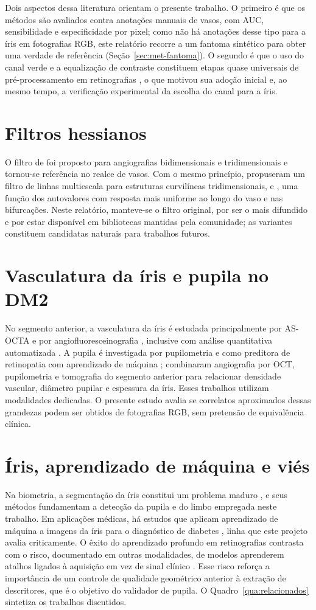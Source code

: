 \documentclass[12pt, oneside, a4paper, chapter=TITLE, section=TITLE,
               english, brazil]{abntex2}
\newcommand{\secao}[1]{\section[\texorpdfstring{\protect\MakeTextUppercase{#1}}{#1}]{#1}}
\begin{document}
Dois aspectos dessa literatura orientam o presente trabalho. O primeiro é que
os métodos são avaliados contra anotações manuais de vasos, com AUC,
sensibilidade e especificidade por pixel; como não há anotações desse tipo
para a íris em fotografias RGB, este relatório recorre a um fantoma sintético
para obter uma verdade de referência (Seção~\ref{sec:met-fantoma}). O segundo
é que o uso do canal verde e a equalização de contraste constituem etapas
quase universais de pré-processamento em retinografias \citep*{Fraz2012}, o
que motivou sua adoção inicial e, ao mesmo tempo, a verificação experimental
da escolha do canal para a íris.

\secao{Filtros hessianos}

O filtro de \citet{Frangi1998} foi proposto para angiografias bidimensionais e
tridimensionais e tornou-se referência no realce de vasos. Com o mesmo
princípio, \citet{Sato1998} propuseram um filtro de linhas multiescala para
estruturas curvilíneas tridimensionais, e \citet{Jerman2016}, uma função dos
autovalores com resposta mais uniforme ao longo do vaso e nas bifurcações.
Neste relatório, manteve-se o filtro original, por ser o mais difundido e por
estar disponível em bibliotecas mantidas pela comunidade; as variantes
constituem candidatas naturais para trabalhos futuros.

\secao{Vasculatura da íris e pupila no DM2}

No segmento anterior, a vasculatura da íris é estudada principalmente por
AS-OCTA e por angiofluoresceinografia \citep*{Roberts2017,Zett2018,Zhou2025},
inclusive com análise quantitativa automatizada \citep*{Zhu2026}. A pupila é
investigada por pupilometria \citep*{Thakar2025} e como preditora de
retinopatia com aprendizado de máquina \citep*{Surya2026}; \citet{Cui2024}
combinaram angiografia por OCT, pupilometria e tomografia do segmento anterior
para relacionar densidade vascular, diâmetro pupilar e espessura da íris.
Esses trabalhos utilizam modalidades dedicadas. O presente estudo avalia se
correlatos aproximados dessas grandezas podem ser obtidos de fotografias RGB,
sem pretensão de equivalência clínica.

\secao{Íris, aprendizado de máquina e viés}

Na biometria, a segmentação da íris constitui um problema maduro
\citep*{Bowyer2008,Daugman2004,Wildes1997}, e seus métodos fundamentam a
detecção da pupila e do limbo empregada neste trabalho. Em aplicações
médicas, há estudos que aplicam aprendizado de máquina a imagens da íris para
o diagnóstico de diabetes \citep*{SamantAgarwal2018}, linha que este projeto
avalia criticamente. O êxito do aprendizado profundo em retinografias
\citep*{Gulshan2016} contrasta com o risco, documentado em outras
modalidades, de modelos aprenderem atalhos ligados à aquisição em vez de sinal
clínico \citep*{Zech2018}. Esse risco reforça a importância de um controle de
qualidade geométrico anterior à extração de descritores, que é o objetivo do
validador de pupila. O Quadro~\ref{qua:relacionados} sintetiza os trabalhos
discutidos.
\end{document}
